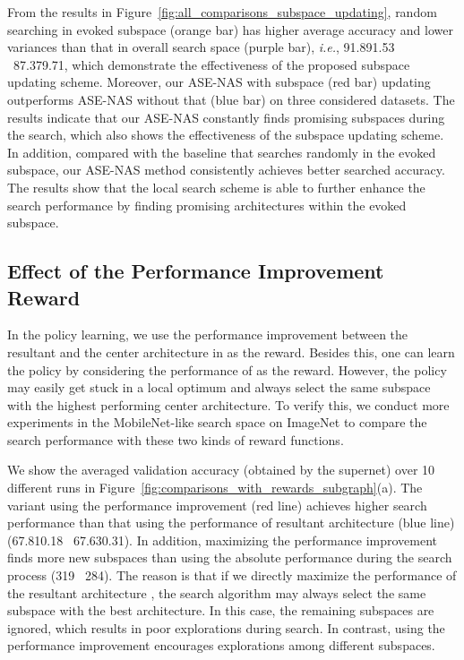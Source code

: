 \documentclass[lettersize,journal]{IEEEtran}
\newcommand{\sexyname}{ASE-NAS\xspace}
\def\ie{\emph{i.e.}} \def\Ie{\emph{I.e.}}
\begin{document}
From the results in Figure~\ref{fig:all_comparisons_subspace_updating}, random searching in evoked subspace (orange bar) has higher average accuracy and lower variances than that in overall search space (purple bar), \ie, 91.891.53 \vs~87.379.71, which demonstrate the effectiveness of the proposed subspace updating scheme.
Moreover, our \sexyname with subspace (red bar) updating outperforms \sexyname without that (blue bar) on three considered datasets. The results indicate that our \sexyname constantly finds promising subspaces during the search, which also shows the effectiveness of the subspace updating scheme.
In addition, compared with the baseline that searches randomly in the evoked subspace, our \sexyname method consistently achieves better searched accuracy. The results show that the local search scheme is able to further enhance the search performance by finding promising architectures within the evoked subspace.


\subsection{Effect of the Performance Improvement Reward}\label{sec:ablation_perf_imp_reward}

In the policy learning, we use the performance improvement between the resultant  and the center architecture  in  as the reward.
Besides this, one can learn the policy by considering the performance of  as the reward.
However, the policy may easily get stuck in a local optimum and always select the same subspace with the highest performing center architecture.
To verify this, we conduct more experiments in the MobileNet-like search space on ImageNet to compare the search performance with these two kinds of reward functions.

We show the averaged validation accuracy (obtained by the supernet) over 10 different runs in Figure~\ref{fig:comparisons_with_rewards_subgraph}(a).
The variant using the performance improvement (red line) achieves higher search performance than that using the performance of resultant architecture (blue line) (67.810.18 \vs~67.630.31).
In addition, maximizing the performance improvement finds more new subspaces than using the absolute performance during the search process (319 \vs~284).
The reason is that if we directly maximize the performance of the resultant architecture , the search algorithm may always select the same subspace with the best architecture.
In this case, the remaining subspaces are ignored, which results in poor explorations during search.
In contrast, using the performance improvement encourages explorations among different subspaces.
\end{document}
